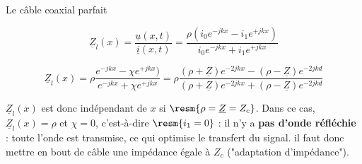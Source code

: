 \begin{exo}[PC][1][devoir]{Le câble coaxial parfait}
\begin{quest}
{   $$\underline{Z}_l(x)=\frac{\underline{u}(x,t)}{\underline{i}(x,t)}=\frac{\rho(i_0e^{-jkx}-i_1e^{+jkx})}{i_0e^{-jkx}+i_1e^{+jkx}}$$

   $$\underline{Z}_l(x)=\rho\frac{e^{-jkx}-\chi e^{+jkx})}{e^{-jkx}+\chi e^{+jkx}}=\rho\frac{(\rho+\underline{Z})e^{-2jkx}-(\rho-\underline{Z}) e^{-2jkd}}{(\rho+\underline{Z})e^{-2jkx}+(\rho-\underline{Z})  e^{-2jkd}}$$

   $\underline{Z}_l(x)$ est donc indépendant de $x$ si $\resm{\rho=\underline{Z}=Z_c}$. Dans ce cas, $\underline{Z}_l(x)=\rho$ et $\chi=0$, c'est-à-dire $\resm{i_1=0}$ : il n'y a \textbf{pas d'onde réfléchie} : toute l'onde est transmise, ce qui optimise le transfert du signal. il faut donc mettre en bout de câble une impédance égale à $Z_c$ ("adaptation d'impédance").
   }
\end{quest}
\end{exo}

